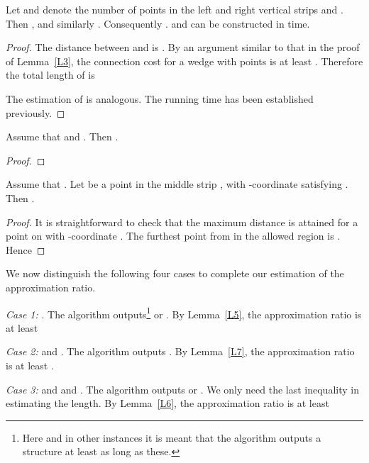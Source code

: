 \documentclass[proceedings]{stacs}
\begin{document}
\begin{lemma} \label{L6}
Let  and  denote the number of points in the left and right
vertical strips  and . Then ,
and similarly . Consequently
.
 and  can be constructed in  time.
\end{lemma}
\begin{proof}
The distance between  and  is .
By an argument similar to that in the proof of Lemma~\ref{L3},
the connection cost for a wedge with  points is
at least . Therefore the total length of  is

The estimation of  is analogous. The running time has been
established previously.
\end{proof}


\begin{lemma} \label{L7}
Assume that  and .
Then .
\end{lemma}
\begin{proof}


\vspace{-1.5\baselineskip}
\end{proof}


\begin{lemma} \label{L8}
Assume that .
Let  be a point in the middle strip , with -coordinate
satisfying . Then .
\end{lemma}
\begin{proof}
It is straightforward to check that the maximum distance is attained
for a point  on  with -coordinate .
The furthest point from  in the allowed region is . Hence


\vspace{-1.5\baselineskip}
\end{proof}


We now distinguish the following four cases to complete our
estimation of the approximation ratio.


\smallskip
{\em Case 1:} . The algorithm
outputs\footnote{Here and in other instances it is meant that the
algorithm outputs a structure at least as long as these.}
 or . By Lemma~\ref{L5}, the approximation ratio is
at least



\smallskip
{\em Case 2:}  and
. The algorithm outputs .
By Lemma~\ref{L7}, the approximation ratio is
at least .

\smallskip
{\em Case 3:}  and
 and .
The algorithm outputs  or .
We only need the last inequality in estimating the length.
By Lemma~\ref{L6}, the approximation ratio is at least
\end{document}
